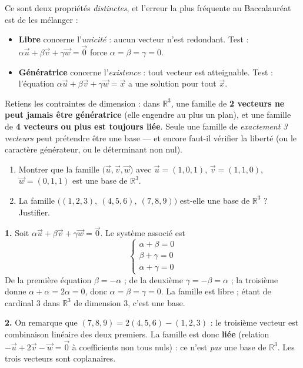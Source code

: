 \documentclass[11pt]{article}
\begin{document}
\begin{attention}
Ce sont deux propriétés \emph{distinctes}, et l'erreur la plus fréquente au Baccalauréat est de les mélanger :
\begin{itemize}
\item \textbf{Libre} concerne l'\emph{unicité} : aucun vecteur n'est redondant. Test : $\alpha\vec{u} + \beta\vec{v} + \gamma\vec{w} = \vec{0}$ force $\alpha = \beta = \gamma = 0$.
\item \textbf{Génératrice} concerne l'\emph{existence} : tout vecteur est atteignable. Test : l'équation $\alpha\vec{u} + \beta\vec{v} + \gamma\vec{w} = \vec{x}$ a une solution pour tout $\vec{x}$.
\end{itemize}
Retiens les contraintes de dimension : dans $\mathbb{R}^3$, une famille de \textbf{2 vecteurs ne peut jamais être génératrice} (elle engendre au plus un plan), et une famille de \textbf{4 vecteurs ou plus est toujours liée}. Seule une famille de \emph{exactement 3 vecteurs} peut prétendre être une base — et encore faut-il vérifier la liberté (ou le caractère générateur, ou le déterminant non nul).
\end{attention}

\begin{exercice}
\begin{enumerate}
\item Montrer que la famille $\big(\vec{u}, \vec{v}, \vec{w}\big)$ avec $\vec{u} = (1, 0, 1)$, $\vec{v} = (1, 1, 0)$, $\vec{w} = (0, 1, 1)$ est une base de $\mathbb{R}^3$.
\item La famille $\big((1, 2, 3),\ (4, 5, 6),\ (7, 8, 9)\big)$ est-elle une base de $\mathbb{R}^3$ ? Justifier.
\end{enumerate}
\end{exercice}

\begin{corrige}[Exercice 1]
\textbf{1.} Soit $\alpha \vec{u} + \beta \vec{v} + \gamma \vec{w} = \vec{0}$. Le système associé est
\[ \begin{cases} \alpha + \beta = 0 \\ \beta + \gamma = 0 \\ \alpha + \gamma = 0 \end{cases} \]
De la première équation $\beta = -\alpha$ ; de la deuxième $\gamma = -\beta = \alpha$ ; la troisième donne $\alpha + \alpha = 2\alpha = 0$, donc $\alpha = \beta = \gamma = 0$. La famille est libre ; étant de cardinal 3 dans $\mathbb{R}^3$ de dimension 3, c'est une base.

\textbf{2.} On remarque que $(7, 8, 9) = 2(4, 5, 6) - (1, 2, 3)$ : le troisième vecteur est combinaison linéaire des deux premiers. La famille est donc \textbf{liée} (relation $-\vec{u} + 2\vec{v} - \vec{w} = \vec{0}$ à coefficients non tous nuls) : ce n'est \emph{pas} une base de $\mathbb{R}^3$. Les trois vecteurs sont coplanaires.
\end{corrige}
\end{document}
